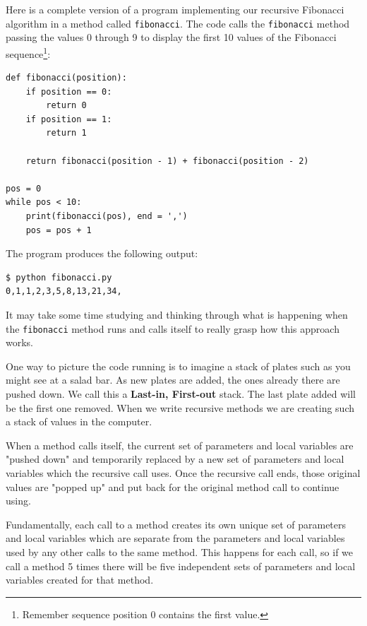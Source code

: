 \pagebreak

Here is a complete version of a program implementing our recursive Fibonacci algorithm in a method called \texttt{fibonacci}. The code calls the \texttt{fibonacci} method passing the values 0 through 9 to display the first 10 values of the Fibonacci sequence\footnote{Remember sequence position 0 contains the first value.}:

\beforeverb
\begin{verbatim}
def fibonacci(position):
    if position == 0:
        return 0
    if position == 1:
        return 1

    return fibonacci(position - 1) + fibonacci(position - 2)

pos = 0
while pos < 10:
    print(fibonacci(pos), end = ',')
    pos = pos + 1
\end{verbatim}
\afterverb

The program produces the following output:

\beforeverb
\begin{verbatim}
$ python fibonacci.py 
0,1,1,2,3,5,8,13,21,34,
\end{verbatim}
\afterverb

It may take some time studying and thinking through what is happening when the \texttt{fibonacci} method runs and calls itself to really grasp how this approach works.

One way to picture the code running is to imagine a stack of plates such as you might see at a salad bar. As new plates are added, the ones already there are pushed down. We call this a \textbf{Last-in, First-out} stack. The last plate added will be the first one removed. When we write recursive methods we are creating such a stack of values in the computer.


When a method calls itself, the current set of parameters and local variables are "pushed down" and temporarily replaced by a new set of parameters and local variables which the recursive call uses. Once the recursive call ends, those original values are "popped up" and put back for the original method call to continue using.

Fundamentally, each call to a method creates its own unique set of parameters and local variables which are separate from the parameters and local variables used by any other calls to the same method. This happens for each call, so if we call a method 5 times there will be five independent sets of parameters and local variables created for that method.

